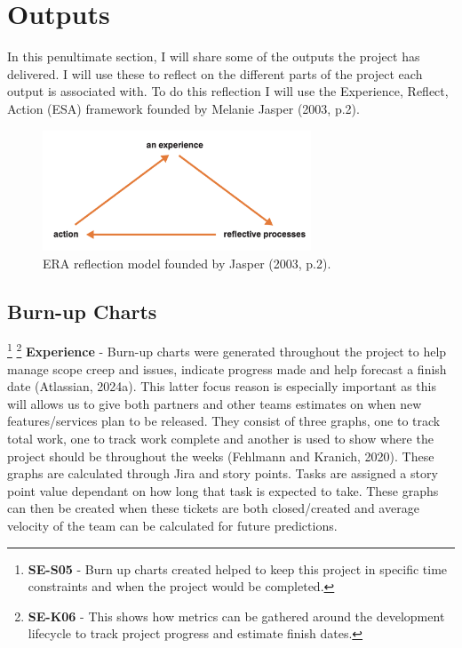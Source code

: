 \section{Outputs}
  In this penultimate section, I will share some of the outputs the project has delivered. I will use these to reflect on the different parts of the project
  each output is associated with. To do this reflection I will use the Experience, Reflect, Action (ESA) framework founded by Melanie Jasper (2003, p.2).

  \begin{figure}[H]
    \centering
    \includegraphics[width=8cm]{assets/eraReflection.png}
    \caption{ERA reflection model founded by Jasper (2003, p.2).}
    \label{fig:eraReflection}
  \end{figure}  

  \subsection{Burn-up Charts}
  \label{sec:burnup}
  
  \footnote{\textbf{SE-S05} - Burn up charts created helped to keep this project in specific time constraints and when the project would be completed.}
  \footnote{\textbf{SE-K06} - This shows how metrics can be gathered around the development lifecycle to track project progress and estimate finish dates.}
  \textbf{Experience} - Burn-up charts were generated throughout the project to help manage scope creep and issues, indicate progress made and help
  forecast a finish date (Atlassian, 2024a). This latter focus reason is especially important as this will allows us to give both partners and other 
  teams estimates on when new features/services plan to be released. They consist of three graphs, one to track total work, one to track work complete 
  and another is used to show where the project should be throughout the weeks (Fehlmann and Kranich, 2020). These graphs are calculated through Jira 
  and story points. Tasks are assigned a story point value dependant on how long that task is expected to take. These graphs can then be created when 
  these tickets are both closed/created and average velocity of the team can be calculated for future predictions.

